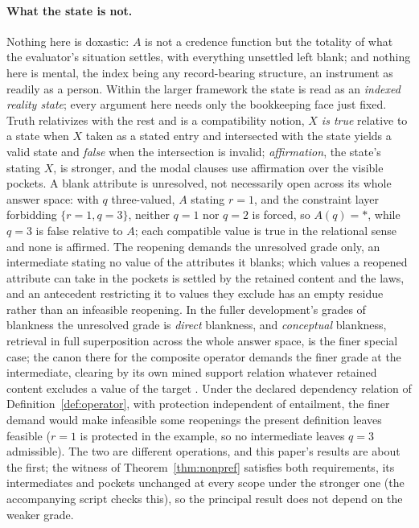 \paragraph{What the state is not.} Nothing here is doxastic: $A$ is not a credence function but the totality of what the evaluator's situation settles, with everything unsettled left blank; and nothing here is mental, the index being any record-bearing structure, an instrument as readily as a person. Within the larger framework the state is read as an \emph{indexed reality state}; every argument here needs only the bookkeeping face just fixed. Truth relativizes with the rest and is a compatibility notion, \emph{$X$ is true} relative to a state when $X$ taken as a stated entry and intersected with the state yields a valid state and \emph{false} when the intersection is invalid; \emph{affirmation}, the state's stating $X$, is stronger, and the modal clauses use affirmation over the visible pockets. A blank attribute is unresolved, not necessarily open across its whole answer space: with $q$ three-valued, $A$ stating $r = 1$, and the constraint layer forbidding $\{r = 1, q = 3\}$, neither $q = 1$ nor $q = 2$ is forced, so $A(q) = \ast$, while $q = 3$ is false relative to $A$; each compatible value is true in the relational sense and none is affirmed. The reopening demands the unresolved grade only, an intermediate stating no value of the attributes it blanks; which values a reopened attribute can take in the pockets is settled by the retained content and the laws, and an antecedent restricting it to values they exclude has an empty residue rather than an infeasible reopening. In the fuller development's grades of blankness the unresolved grade is \emph{direct} blankness, and \emph{conceptual} blankness, retrieval in full superposition across the whole answer space, is the finer special case; the canon there for the composite operator demands the finer grade at the intermediate, clearing by its own mined support relation whatever retained content excludes a value of the target \parencite{Aethus}. Under the declared dependency relation of Definition~\ref{def:operator}, with protection independent of entailment, the finer demand would make infeasible some reopenings the present definition leaves feasible ($r = 1$ is protected in the example, so no intermediate leaves $q = 3$ admissible). The two are different operations, and this paper's results are about the first; the witness of Theorem~\ref{thm:nonpref} satisfies both requirements, its intermediates and pockets unchanged at every scope under the stronger one (the accompanying script checks this), so the principal result does not depend on the weaker grade.

